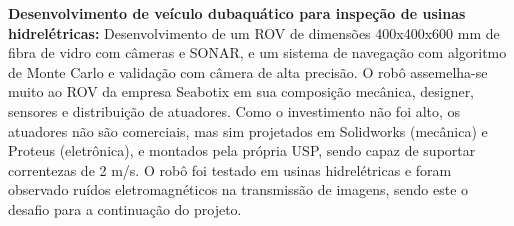 \textbf{Desenvolvimento de veículo dubaquático para inspeção de usinas
hidrelétricas:}
Desenvolvimento de um ROV de dimensões 400x400x600 mm de fibra de vidro com
câmeras e SONAR, e um sistema de navegação com algoritmo de Monte
Carlo e validação com câmera de alta precisão. O robô assemelha-se muito ao ROV
da empresa Seabotix em sua composição mecânica, designer, sensores e distribuição de atuadores. Como o investimento
não foi alto, os atuadores não são comerciais, mas sim projetados em Solidworks
(mecânica) e Proteus (eletrônica), e montados pela própria USP, sendo capaz de
suportar correntezas de 2 m/s. O robô foi testado em usinas
hidrelétricas e foram observado ruídos eletromagnéticos na transmissão de
imagens, sendo este o desafio para a continuação do projeto.
